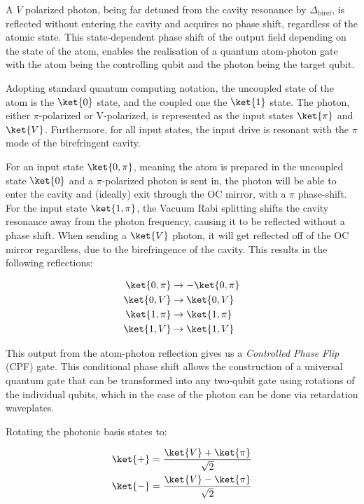 A $V$ polarized photon, being far detuned from the cavity resonance by $\Delta_{\text{biref}}$, is reflected without entering the cavity and acquires no phase shift, regardless of the atomic state.
This state-dependent phase shift of the output field depending on the state of the atom, enables the realisation of a quantum atom-photon gate with the atom being the controlling qubit and the photon being the target qubit.\cite{DuanKimble2004}

Adopting standard quantum computing notation, the uncoupled state of the atom is the $\ket{0}$ state, and the coupled one the $\ket{1}$ state. The photon, either $\pi\text{-polarized}$ or V-polarized, is represented as the input states $\ket{\pi}$ and $\ket{V}$. Furthermore, for all input states, the input drive is resonant with the $\pi$ mode of the birefringent cavity.

For an input state $\ket{0,\pi}$, meaning the atom is prepared in the uncoupled state $\ket{0}$ and a $\pi$-polarized photon is sent in, the photon will be able to enter the cavity and (ideally) exit through the OC mirror, with a $\pi$ phase-shift. For the input state $\ket{1,\pi}$, the Vacuum Rabi splitting shifts the cavity resonance away from the photon frequency, causing it to be reflected without a phase shift. When sending a $\ket{V}$ photon, it will get reflected off of the OC mirror regardless, due to the birefringence of the cavity. This results in the following reflections:

\begin{equation}
	\label{eq:reflection_cpf}
	\begin{split}
		\ket{0,\pi} & \rightarrow-\ket{0,\pi} \\
		\ket{0,V}   & \rightarrow\ket{0,V}    \\
		\ket{1,\pi} & \rightarrow\ket{1,\pi}  \\
		\ket{1,V}   & \rightarrow\ket{1,V}
	\end{split}
\end{equation}

This output from the atom-photon reflection gives us a \textit{Controlled Phase Flip} (CPF) gate. This conditional phase shift allows the construction of a universal quantum gate that can be transformed into any two-qubit gate using rotations of the individual qubits, which in the case of the photon can be done via retardation waveplates.

Rotating the photonic basis states to:

\begin{equation}
	\label{eq:cnot_basis}
	\begin{split}
		\ket{+} & = \frac{\ket{V} + \ket{\pi}}{\sqrt{2}} \\
		\ket{-} & = \frac{\ket{V} - \ket{\pi}}{\sqrt{2}}
	\end{split}
\end{equation}

